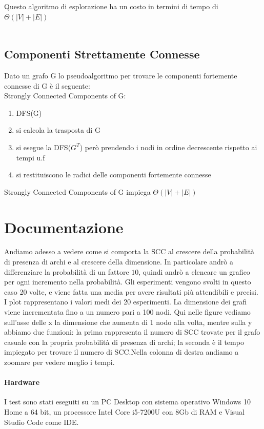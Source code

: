 \documentclass[12pt]{article}
\begin{document}
Questo algoritmo di esplorazione ha un costo in termini di tempo di $\Theta(|V| + |E|)$ \\\\

\subsection{Componenti Strettamente Connesse}

Dato un grafo G lo pseudoalgoritmo per trovare le componenti fortemente connesse di G è il seguente:\\

\noindent
Strongly Connected Components of G:
\begin{enumerate}
\item	DFS(G)
\item	si calcola la trasposta di G
\item	si esegue la DFS($G^T$) però prendendo i nodi in ordine decrescente rispetto ai tempi u.f
\item	si restituiscono le radici delle componenti fortemente connesse
\end{enumerate}
	
\noindent
Strongly Connected Components of G impiega $\Theta(|V| + |E|)$

\section{Documentazione}
Andiamo adesso a vedere come si comporta la SCC al crescere della probabilità di presenza di archi e 
al crescere della dimensione. In particolare andrò a differenziare la probabilità di un fattore $10$, quindi 
andrò a elencare un grafico per ogni incremento nella probabilità.
Gli esperimenti vengono svolti in questo caso 20 volte, e viene fatta una media per avere risultati più attendibili e precisi. I plot rappresentano i valori medi dei 20 esperimenti.
La dimensione dei grafi viene incrementata fino a un numero pari a 100 nodi.
Qui nelle figure vediamo sull'asse delle x la dimensione che aumenta di 1 nodo alla volta, mentre sulla y abbiamo due funzioni: la prima rappresenta il numero di SCC trovate per il grafo casuale con la propria probabilità di presenza di archi; la seconda è il tempo impiegato per trovare il numero di SCC.Nella colonna di destra andiamo a zoomare per vedere meglio i tempi.

\paragraph{Hardware}
I test sono stati eseguiti su un PC Desktop con sistema operativo Windows 10 Home a 64 bit, un processore Intel Core i5-7200U con 8Gb di RAM e Visual Studio Code come IDE.
\end{document}
